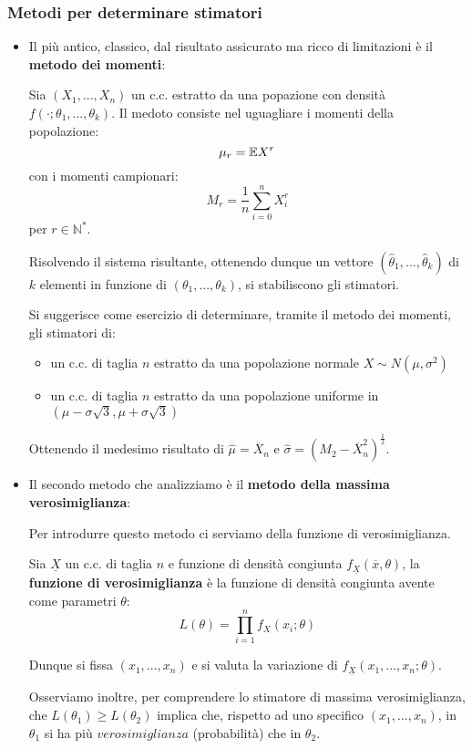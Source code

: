 \subsubsection{Metodi per determinare stimatori}
\begin{itemize}
    \item Il più antico, classico, dal risultato assicurato ma ricco di limitazioni è il \textbf{metodo dei momenti}:

Sia $(X_1,...,X_n)$ un c.c. estratto da una popazione con densità $f(\cdot;\theta_1,...,\theta_k)$. Il medoto consiste nel uguagliare i momenti della popolazione:\[\mu_r=\mathbb{E} X^r\] con i momenti campionari: \[M_r=\frac{1}{n}\sum_{i=0}^nX_i^r\] per $r\in\mathbb{N}^*$. 

Risolvendo il sistema risultante, ottenendo dunque un vettore $(\hat{\theta}_1,...,\hat{\theta}_k)$ di $k$ elementi in funzione di $(\theta_1,...,\theta_k)$, si stabiliscono gli stimatori.

\vspace{10px}

Si suggerisce come esercizio di determinare, tramite il metodo dei momenti, gli stimatori di:
\begin{itemize}
    \item un c.c. di taglia $n$ estratto da una popolazione normale $X\sim N(\mu,\sigma^2)$
    \item un c.c. di taglia $n$ estratto da una popolazione uniforme in  \newline $(\mu-\sigma\sqrt{3},\mu+\sigma\sqrt{3})$
\end{itemize} 
Ottenendo il medesimo risultato di $\hat{\mu}=\overline{X}_n$ e $\hat{\sigma}=(M_2-\overline{X}_n^2)^{\frac{1}{2}}$.
    \item Il secondo metodo che analizziamo è il \textbf{metodo della massima verosimiglianza}:
    
Per introdurre questo metodo ci serviamo della funzione di verosimiglianza.
\begin{definition}
Sia $\underline{X}$ un c.c. di taglia $n$ e funzione di densità congiunta $f_{\underline{X}}(\overline{x},\theta)$, la \textbf{funzione di verosimiglianza} è la funzione di densità congiunta avente come parametri $\theta$: \[L(\theta)=\prod_{i=1}^nf_X(x_i;\theta)\] 
\end{definition}
Dunque si fissa $(x_1,...,x_n)$ e si valuta la variazione di $f_{\underline{X}}(x_1,...,x_n;\theta)$.

Osserviamo inoltre, per comprendere lo stimatore di massima verosimiglianza, che $L(\theta_1)\geq L(\theta_2)$ implica che, rispetto ad uno specifico $(x_1,...,x_n)$, in $\theta_1$ si ha più $verosimiglianza$ (probabilità) che in $\theta_2$.


\end{itemize}
